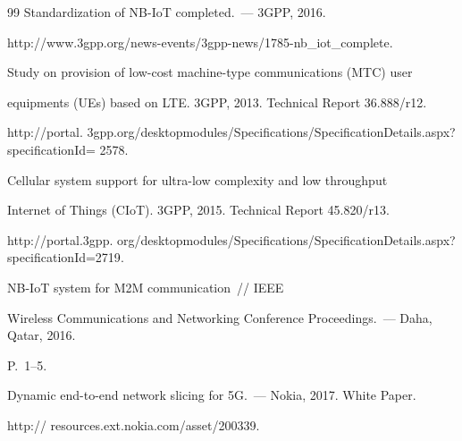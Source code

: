 {{\begin{thebibliography}{99}
Standardization of NB-IoT completed.~--- 3GPP, 2016.


{\sf http://www.3gpp.org/news-events/3gpp-news/1785-nb\_iot\_complete}.


    


   


    




    Study on provision of low-cost machine-type communications (MTC) user 


equipments (UEs) based on LTE. 3GPP, 2013. Technical Report 36.888/r12. 


{\sf http://portal. 3gpp.org/desktopmodules/Specifications/SpecificationDetails.aspx?specificationId= 2578}.


    




    Cellular system support for ultra-low complexity and low throughput 


Internet of Things (CIoT). 3GPP, 2015. Technical Report 45.820/r13.


   {\sf http://portal.3gpp. org/desktopmodules/Specifications/SpecificationDetails.aspx?specificationId=2719}.


   






    \newblock NB-IoT system for M2M communication~/\!\!/   IEEE 


Wireless Communications and Networking Conference Proceedings.~--- Daha, Qatar, 2016.  


P.~1--5.


    




    Dynamic end-to-end network slicing for 5G.~--- Nokia, 2017. White Paper.


{\sf http:// resources.ext.nokia.com/asset/200339}.


    







\end{thebibliography}}}
